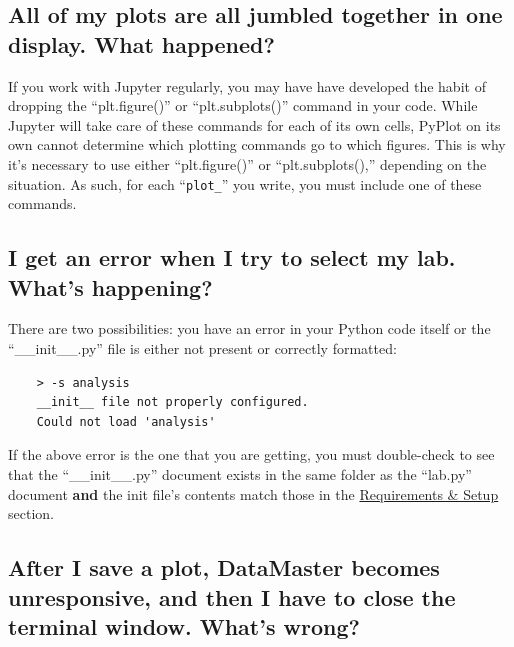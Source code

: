 \documentclass[12pt]{article}
\begin{document}
{\subsection*{All of my plots are all jumbled together in one display. What happened?}

If you work with Jupyter regularly, you may have have developed the habit of dropping the ``plt.figure()'' or ``plt.subplots()'' command in your code. While Jupyter will take care of these commands for each of its own cells, PyPlot on its own cannot determine which plotting commands go to which figures. This is why it's necessary to use either ``plt.figure()'' or ``plt.subplots(),'' depending on the situation. As such, for each ``\texttt{plot\_}'' you write, you must include one of these commands.

\subsection*{I get an error when I try to select my lab. What's happening?}

There are two possibilities: you have an error in your Python code itself or the ``\_\_init\_\_.py'' file is either not present or correctly formatted:
\begin{framed}
  \begin{lstlisting}
    > -s analysis
    __init__ file not properly configured.
    Could not load 'analysis'
  \end{lstlisting}
\end{framed}
If the above error is the one that you are getting, you must double-check to see that the ``\_\_init\_\_.py'' document exists in the same folder as the ``lab.py'' document \textbf{and} the init file's contents match those in the \hyperref[sec:reqs]{Requirements \& Setup} section.

\subsection*{After I save a plot, DataMaster becomes unresponsive, and then I have to close the terminal window. What's wrong?}

}
\end{document}
